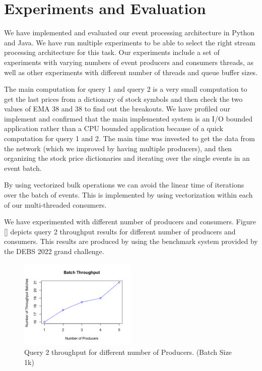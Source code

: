 \section{Experiments and Evaluation}\label{sec:experiments}
We have implemented and evaluated our event processing architecture in Python and Java. We have run multiple experiments  to be 
able to select the right stream processing architecture for this task. Our experiments include a set of experiments with varying 
numbers of event producers and consumers threads, as well as other experiments with different number of threads and queue buffer sizes. 

The main computation for query 1 and query 2 is a very small computation to get the last prices from a dictionary of stock symbols and then 
check the two values of EMA 38 and 38 to find out the breakouts. We have profiled our implement and confirmed that the main implemented system 
is an I/O bounded application rather than a CPU bounded application because of a quick computation for query 1 and 2. The main time was 
invested to get the data from the network (which we improved by having multiple producers), and then organizing the stock price 
dictionaries and iterating over the single events in an event batch. 

By using vectorized bulk operations we can avoid the linear time of iterations over the batch of events. This is implemented by using 
vectorization within each of our multi-threaded consumers. 

We have experimented with different number of producers and consumers. 
Figure \ref{} depicts query 2 throughput results for different number of producers and consumers. 
This results are produced by using the benchmark system provided by the DEBS 2022 grand challenge. 


\begin{figure}[]
    \begin{center}
        \includegraphics[width=0.5\textwidth]{./images/throughput.png}
        \caption{Query 2 throughput for different number of Producers. (Batch Size 1k)}
        \label{fig:evaluation}
    \end{center}
\end{figure}



